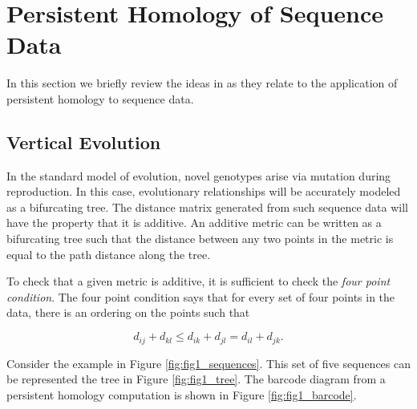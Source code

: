 \section{Persistent Homology of Sequence Data}
\label{sec:background}

In this section we briefly review the ideas in \citet{Chan:2013} as they relate to the application of persistent homology to sequence data.

\subsection{Vertical Evolution}
\label{subsec:vertical_evolution}
%
In the standard model of evolution, novel genotypes arise via mutation during reproduction.
In this case, evolutionary relationships will be accurately modeled as a bifurcating tree.
The distance matrix generated from such sequence data will have the property that it is additive.
An additive metric can be written as a bifurcating tree such that the distance between any two points in the metric is equal to the path distance along the tree.

To check that a given metric is additive, it is sufficient to check the \emph{four point condition}.
The four point condition says that for every set of four points in the data, there is an ordering on the points such that

\begin{equation}
d_{ij}+d_{kl} \leq d_{ik}+d_{jl} = d_{il}+d_{jk}.
\end{equation}

Consider the example in Figure \ref{fig:fig1_sequences}.
This set of five sequences can be represented the tree in Figure \ref{fig:fig1_tree}.
The barcode diagram from a persistent homology computation is shown in Figure \ref{fig:fig1_barcode}.


